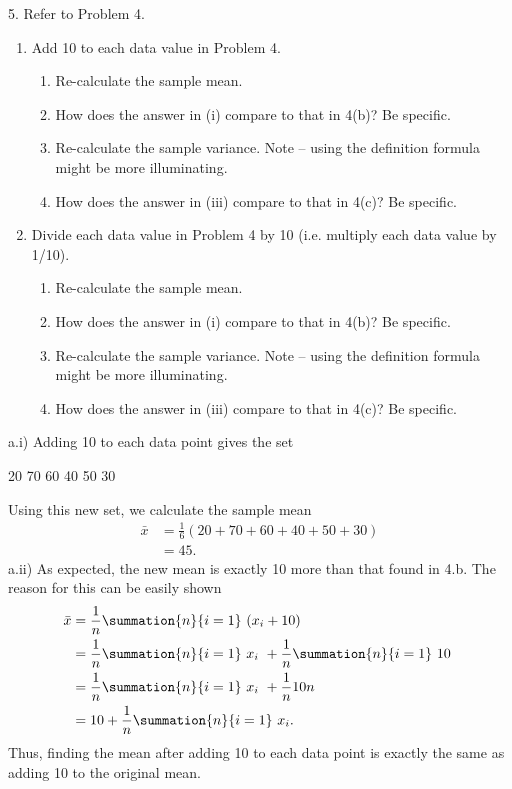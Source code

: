 \documentclass{report}
\begin{document}
    \pagebreak 
    \begin{mdframed}
       5.  Refer to Problem 4.
       \begin{enumerate}[label=(\alph*)]
           \item Add 10 to each data value in Problem 4.
           \begin{enumerate}[label=(\roman*)]
               \item Re-calculate the sample mean. 
               \item How does the answer in (i) compare to that in 4(b)? Be specific. 
               \item Re-calculate the sample variance. Note – using the definition formula might be more illuminating. 
               \item How does the answer in (iii) compare to that in 4(c)? Be specific. 
           \end{enumerate}
       \item Divide each data value in Problem 4 by 10 (i.e. multiply each data value by 1/10).
           \begin{enumerate}[label=(\roman*)]
               \item  Re-calculate the sample mean. 
               \item How does the answer in (i) compare to that in 4(b)? Be specific. 
               \item Re-calculate the sample variance. Note – using the definition formula might be more illuminating. 
               \item How does the answer in (iii) compare to that in 4(c)? Be specific. 
           \end{enumerate}
       \end{enumerate}
    \end{mdframed}
    \bigbreak \noindent 
    a.i) Adding 10 to each data point gives the set
    \bigbreak \noindent 
    \begin{center}
        20 70 60 40 50 30
    \end{center}
    \bigbreak \noindent 
    Using this new set, we calculate the sample mean
    \bigbreak \noindent 
    \begin{align*}
        \bar{x} &= \frac{1}{6}(20 + 70 + 60 + 40 + 50 + 30) \\
        &=45
    .\end{align*}
    \bigbreak \noindent 
    a.ii) As expected, the new mean is exactly 10 more than that found in 4.b. The reason for this can be easily shown
    \bigbreak \noindent 
    \begin{align*}
        \bar{x} &= \frac{1}{n}\summation{n}{i=1}\ (x_{i} + 10)\ \\
                &=\frac{1}{n}\summation{n}{i=1}\ x_{i}\ + \frac{1}{n}\summation{n}{i=1}\ 10\ \\
                &=\frac{1}{n}\summation{n}{i=1}\ x_{i}\ + \frac{1}{n}10n \\
                &=10+\frac{1}{n}\summation{n}{i=1}\ x_{i}
    .\end{align*}
    \bigbreak \noindent 
    Thus, finding the mean after adding 10 to  each data point is exactly the same as adding 10 to the original mean.
\end{document}
